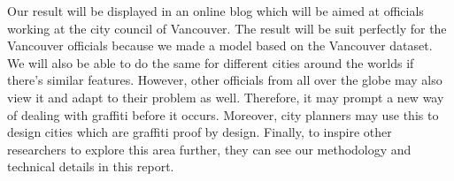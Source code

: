 Our result will be displayed in an online blog which will be aimed at officials working at the city council of Vancouver. The result will be suit perfectly for the Vancouver officials because we made a model based on the Vancouver dataset. We will also be able to do the same for different cities around the worlds if there’s similar features. However, other officials from all over the globe may also view it and adapt to their problem as well. Therefore, it may prompt a new way of dealing with graffiti before it occurs. Moreover, city planners may use this to design cities which are graffiti proof by design. Finally, to inspire other researchers to explore this area further, they can see our methodology and technical details in this report.
